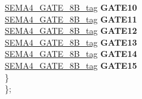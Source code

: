\begin{DoxyCompactItemize}
\begin{tabbing}
\>\>\mbox{\hyperlink{unionSEMA4__GATE__8B__tag}{SEMA4\_GATE\_8B\_tag}} {\bfseries GATE10}\\
\>\>\mbox{\hyperlink{unionSEMA4__GATE__8B__tag}{SEMA4\_GATE\_8B\_tag}} {\bfseries GATE11}\\
\>\>\mbox{\hyperlink{unionSEMA4__GATE__8B__tag}{SEMA4\_GATE\_8B\_tag}} {\bfseries GATE12}\\
\>\>\mbox{\hyperlink{unionSEMA4__GATE__8B__tag}{SEMA4\_GATE\_8B\_tag}} {\bfseries GATE13}\\
\>\>\mbox{\hyperlink{unionSEMA4__GATE__8B__tag}{SEMA4\_GATE\_8B\_tag}} {\bfseries GATE14}\\
\>\>\mbox{\hyperlink{unionSEMA4__GATE__8B__tag}{SEMA4\_GATE\_8B\_tag}} {\bfseries GATE15}\\
\>\} \\
\}; \\


\end{tabbing}
\end{DoxyCompactItemize}
